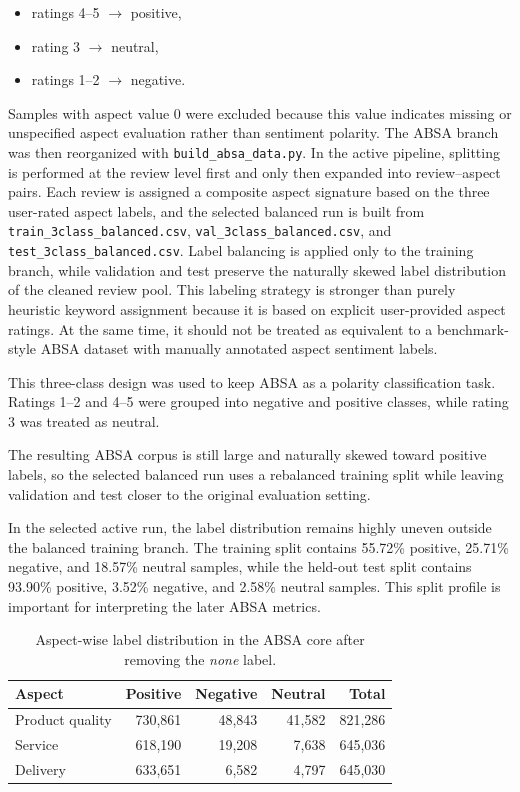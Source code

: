 \documentclass[a4paper,12pt]{extarticle}
\begin{document}
\begin{itemize}[leftmargin=1.5em]
\item ratings 4--5 $\rightarrow$ positive,
\item rating 3 $\rightarrow$ neutral,
\item ratings 1--2 $\rightarrow$ negative.
\end{itemize}


Samples with aspect value 0 were excluded because this value indicates missing or unspecified aspect evaluation rather than sentiment polarity. The ABSA branch was then reorganized with \texttt{build\_absa\_data.py}. In the active pipeline, splitting is performed at the review level first and only then expanded into review--aspect pairs. Each review is assigned a composite aspect signature based on the three user-rated aspect labels, and the selected balanced run is built from \texttt{train\_3class\_balanced.csv}, \texttt{val\_3class\_balanced.csv}, and \texttt{test\_3class\_balanced.csv}. Label balancing is applied only to the training branch, while validation and test preserve the naturally skewed label distribution of the cleaned review pool. This labeling strategy is stronger than purely heuristic keyword assignment because it is based on explicit user-provided aspect ratings. At the same time, it should not be treated as equivalent to a benchmark-style ABSA dataset with manually annotated aspect sentiment labels.


This three-class design was used to keep ABSA as a polarity classification task. Ratings 1--2 and 4--5 were grouped into negative and positive classes, while rating 3 was treated as neutral.


The resulting ABSA corpus is still large and naturally skewed toward positive labels, so the selected balanced run uses a rebalanced training split while leaving validation and test closer to the original evaluation setting.



In the selected active run, the label distribution remains highly uneven outside the balanced training branch. The training split contains 55.72\% positive, 25.71\% negative, and 18.57\% neutral samples, while the held-out test split contains 93.90\% positive, 3.52\% negative, and 2.58\% neutral samples. This split profile is important for interpreting the later ABSA metrics.


\begin{table}[ht]

\centering
\caption{Aspect-wise label distribution in the ABSA core after removing the \textit{none} label.}
\label{tab:absa-aspect-dist}
\begin{tabular}{lrrrr}
\toprule
\textbf{Aspect} & \textbf{Positive} & \textbf{Negative} & \textbf{Neutral} & \textbf{Total} \\
\midrule
Product quality & 730,861 & 48,843 & 41,582 & 821,286 \\
Service & 618,190 & 19,208 & 7,638 & 645,036 \\
Delivery & 633,651 & 6,582 & 4,797 & 645,030 \\
\bottomrule
\end{tabular}

\end{table}
\end{document}

